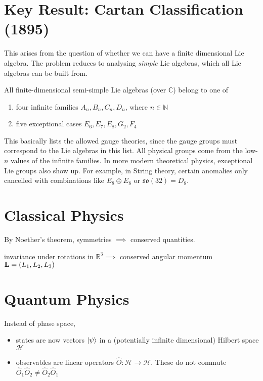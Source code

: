 \section{Key Result: Cartan Classification (1895)}%
\label{sec:key_result_cartan_classification}

This arises from the question of whether we can have a finite dimensional Lie algebra. The problem reduces to analysing \emph{simple} Lie algebras, which all Lie algebras can be built from.

\begin{theorem}
  All finite-dimensional semi-simple Lie algebras (over $\mathbb{C}$) belong to one of
  \begin{enumerate}
    \item four infinite families $A_n, B_n, C_{n}, D_n$, where $n \in \mathbb{N}$
    \item five exceptional cases $E_6, E_7, E_8, G_2, F_4$
  \end{enumerate}
\end{theorem}

This basically lists the allowed gauge theories, since the gauge groups must correspond to the Lie algebras in this list. All physical groups come from the low-$n$ values of the infinite families. In more modern theoretical physics, exceptional Lie groups also show up. For example, in String theory, certain anomalies only cancelled with combinations like $E_8 \oplus E_8$ or $\mathfrak{so}(32) = D_8$.

\section{Classical Physics}%
\label{sec:classical_physics}

By Noether's theorem, symmetries $\implies$ conserved quantities.

\begin{example}
  invariance under rotations in $\mathbb{R}^3 \implies$ conserved angular momentum $\vb L = (L_1, L_2, L_3)$
\end{example}

\section{Quantum Physics}%
\label{sec:quantum_phyiscs}

Instead of phase space, 
\begin{itemize}
  \item states are now vectors $\ket{\psi}$ in a (potentially infinite dimensional) Hilbert space $\mathcal{H}$
  \item observables are linear operators $\hat O: \mathcal{H} \rightarrow \mathcal{H}$. These do not commute $\hat O_1 \hat O_2 \neq \hat O_2 \hat O_1$
\end{itemize}

